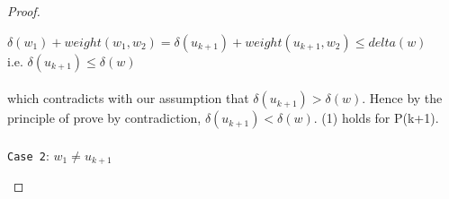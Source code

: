 \documentclass[11pt, oneside]{article}   	%
\newcommand\tab[1][1cm]{\hspace*{#1}}
\theoremstyle{definition}
\begin{document}
\begin{proof}
\begin{itemize}
\begin{enumerate}
    \tab $\delta(w_1) + weight(w_1, w_2) = \delta(u_{k+1}) + weight(u_{k+1}, w_2) \leq delta(w)$\\
    \tab i.e.  $\delta(u_{k+1}) \leq \delta(w)$ 
  \\\\
  which contradicts with our assumption that $\delta(u_{k+1}) > \delta(w)$. Hence by the principle of prove by contradiction, $\delta(u_{k+1}) < \delta(w)$. (1) holds for P(k+1). 
  \\\\
  \texttt{Case 2}: $w_1 \neq u_{k+1}$
  \\ 


\end{enumerate}
\end{itemize}
\end{proof}
\end{document}
